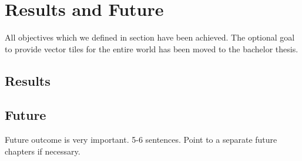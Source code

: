 \chapter{Results and Future}\label{part1_results_and_future}

All objectives which we defined in section  have been achieved. The optional goal to provide vector tiles for the entire world has been moved to the bachelor thesis.

\section{Results}\label{part1_results}


\section{Future}\label{part1_future}

Future outcome is very important.
5-6 sentences. Point to a separate future chapters if necessary.
